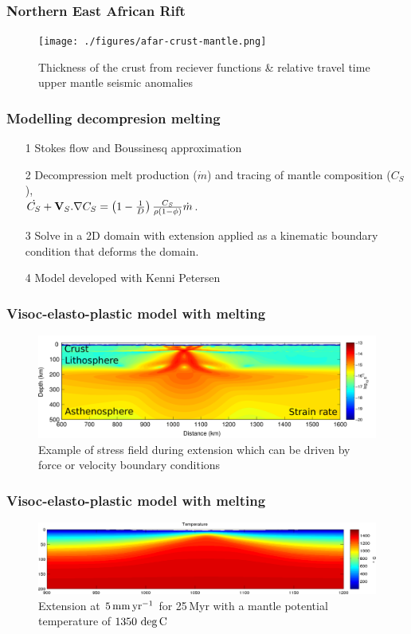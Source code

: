 \documentclass[aspectratio=169]{beamer}
\begin{document}
\begin{frame}
    \frametitle{Northern East African Rift}
    \begin{figure}
        \texttt{[image: ./figures/afar-crust-mantle.png]}
        \caption{Thickness of the crust from reciever functions \& relative travel time upper mantle seismic anomalies}
    \end{figure}
\end{frame}

\begin{frame}
    \frametitle{Modelling decompresion melting}
    \begin{itemize}
        \item[1]{Stokes flow and Boussinesq approximation}
        \item[2]{Decompression melt production ($\dot{m}$) and tracing of mantle composition ($C_{S}$),\\
                 $\dot{C_{S}} + {\bf V}_{S}.\nabla C_{S} = \left(1 - \frac{1}{D}\right)\frac{C_{S}}{\rho(1-\phi)}\dot{m}$}.
        \item[3]{Solve in a 2D domain with extension applied as a kinematic boundary condition that deforms the domain.}
        \item[4]{Model developed with Kenni Petersen}
    \end{itemize}
\end{frame}

\begin{frame}
    \frametitle{Visoc-elasto-plastic model with melting}
    \begin{figure}
        \includegraphics[width=0.8\paperwidth]{./figures/mess-example.png}
        \caption{Example of stress field during extension which can be driven by force or velocity boundary conditions}
    \end{figure}
\end{frame}

\begin{frame}
    \frametitle{Visoc-elasto-plastic model with melting}
    \begin{figure}
        \includegraphics[width=0.8\paperwidth]{./figures/MESS1.png}
        \caption{Extension at $5\rm\,mm\,yr^{-1}$ for 25\,Myr with a mantle potential temperature of $1350\,\deg\rm C$}
    \end{figure}
\end{frame}
\end{document}
